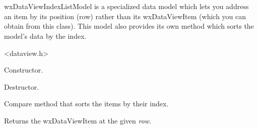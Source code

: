 
\section{}\label{wxdataviewindexlistmodel}

wxDataViewIndexListModel is a specialized data model which lets
you address an item by its position (row) rather than its 
wxDataViewItem (which you can obtain from this class). 
This model also provides its own 
 method
which sorts the model's data by the index.





<dataview.h>



\label{wxdataviewindexlistmodelwxdataviewindexlistmodel}


Constructor.

\label{wxdataviewindexlistmodeldtor}


Destructor.

\label{wxdataviewindexlistmodelcompare}


Compare method that sorts the items by their index.

\label{wxdataviewindexlistmodelgetitem}


Returns the wxDataViewItem at the given {\it row}.

\label{wxdataviewindexlistmodelgetrow}


